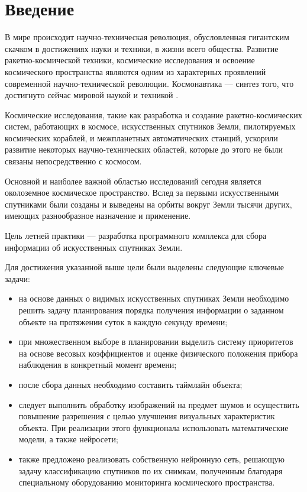 \chapter*{Введение}

В мире происходит научно-техническая революция, обусловленная гигантским скачком в достижениях науки и техники, в жизни всего общества. Развитие ракетно-космической техники, космические исследования и освоение космического пространства являются одним из характерных проявлений современной научно-технической революции. Космонавтика --- синтез того, что достигнуто сейчас мировой наукой и техникой \cite{actuality}.

Космические исследования, такие как разработка и создание ракетно-космических систем, работающих в космосе, искусственных спутников Земли, пилотируемых космических кораблей, и межпланетных автоматических станций, ускорили развитие некоторых научно-технических областей, которые до этого не были связаны непосредственно с космосом.

Основной и наиболее важной областью исследований сегодня является околоземное космическое пространство. Вслед за первыми искусственными спутниками были созданы и выведены на орбиты вокруг Земли тысячи других, имеющих разнообразное назначение и применение.

Цель летней практики --- разработка программного комплекса для сбора информации об искусственных спутниках Земли.

Для достижения указанной выше цели были выделены следующие ключевые задачи:
\begin{itemize}
	\item на основе данных о видимых искусственных спутниках Земли необходимо решить задачу планирования порядка получения информации о заданном объекте на протяжении суток в каждую секунду времени;
	\item при множественном выборе в планировании выделить систему приоритетов на основе весовых коэффициентов и оценке физического положения прибора наблюдения в конкретный момент времени;
	\item после сбора данных необходимо составить таймлайн объекта;
	\item следует выполнить обработку изображений на предмет шумов и осуществить повышение разрешения с целью улучшения визуальных характеристик объекта. При реализации этого функционала использовать математические модели, а также нейросети;
	\item также предложено реализовать собственную нейронную сеть, решающую задачу классификацию спутников по их снимкам, полученным благодаря специальному оборудованию мониторинга космического пространства.
\end{itemize}


